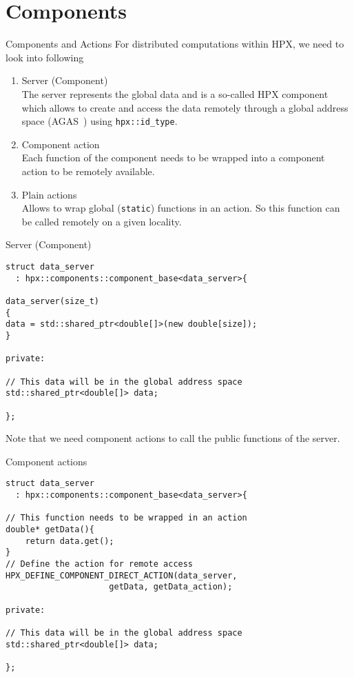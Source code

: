 \documentclass[12pt,t]{beamer}
\begin{document}
\section{Components}

\begin{frame}{Components and Actions}
For distributed computations within HPX, we need to look into following 

\begin{enumerate}
\item Server (Component) \\
The server represents the global data and is a so-called HPX component which allows to create and access the data remotely through a global address space (AGAS~\cite{kaiser2014hpx}) using \lstinline|hpx::id_type|.
\item Component action \\
Each function of the component needs to be wrapped into a component action to be remotely available. 
\item Plain actions \\
Allows to wrap global (\lstinline|static|) functions in an action. So this function can be called remotely on a given locality.
\end{enumerate} 

\end{frame}


\begin{frame}[fragile]{Server (Component)}
\begin{lstlisting}
struct data_server
  : hpx::components::component_base<data_server>{

data_server(size_t)
{
data = std::shared_ptr<double[]>(new double[size]);
}

private:

// This data will be in the global address space 
std::shared_ptr<double[]> data;

};
\end{lstlisting}
Note that we need component actions to call the public functions of the server.
\end{frame}


\begin{frame}[fragile]{Component actions}
\begin{lstlisting}
struct data_server
  : hpx::components::component_base<data_server>{

// This function needs to be wrapped in an action
double* getData(){
    return data.get();
}
// Define the action for remote access
HPX_DEFINE_COMPONENT_DIRECT_ACTION(data_server,
                     getData, getData_action);

private:

// This data will be in the global address space 
std::shared_ptr<double[]> data;

};
\end{lstlisting}
\end{frame}
\end{document}
